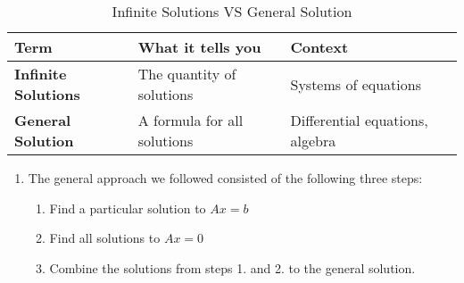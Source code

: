 \begin{customArrayStretch}{1.3}
\begin{table}[H]
    \centering
    \begin{tabular}{|l|l|l|}
        \hline
        \textbf{Term} & 
            \textbf{What it tells you} & 
            \textbf{Context} \\ \hline

        \textbf{Infinite Solutions} & 
            The quantity of solutions & 
            Systems of equations \\ \hline

        \textbf{General Solution} & 
            A formula for all solutions & 
            Differential equations, algebra \\ \hline

    \end{tabular}
    \caption*{Infinite Solutions VS General Solution \cite{common/online/chatgpt}}
\end{table}
\end{customArrayStretch}


\begin{enumerate}
    \item The general approach we followed consisted of the following three steps:
    \begin{enumerate}
        \item Find a particular solution to $Ax = b$
        \hfill \cite{mfml/book/mml/Deisenroth-Faisal-Ong}

        \item Find all solutions to $Ax = 0$
        \hfill \cite{mfml/book/mml/Deisenroth-Faisal-Ong}

        \item Combine the solutions from steps 1. and 2. to the general solution.
        \hfill \cite{mfml/book/mml/Deisenroth-Faisal-Ong}
    \end{enumerate}

    
\end{enumerate}



















